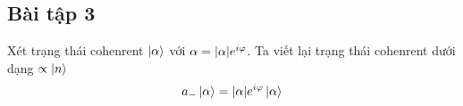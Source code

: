 \documentclass{report}
\newcommand{\f}[2]{\dfrac{#1}{#2}}
\begin{document}
\subsection*{Bài tập 3}
Xét trạng thái cohenrent $\ket{\alpha}$ với $\alpha = \abs{\alpha} e^{i \varphi}$. Ta viết lại trạng thái cohenrent dưới dạng $\propto \ket{n}$
\begin{align*}
	a_{-}\ket{\alpha} = \abs{\alpha} e^{i \varphi}\ket{\alpha}
\end{align*}	
\end{document}
